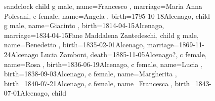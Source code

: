 \documentclass{article}
\begin{document}
\begin{figure}
\begin{minipage}[b]{0.19\textwidth}
\centering

    \begin{genealogypicture}[
        processing=database,
        database format=full,
        node size=3.5cm,
        level size=2.8cm,
        level distance=6mm,
        list separators hang=3mm,
        name font=\bfseries,
        surn code={\textcolor{black!50!black}{#1}},
        place text={\newline}{},
        date format=d month yyyy,
        tcbset={male/.style={colframe=blue,colback=blue!5},
        female/.style={colframe=red,colback=red!5}},
        box={fit basedim=7pt,boxsep=2pt,segmentation style=solid,
            halign=left,before upper=\parskip1pt,
            \gtrDBsex,
        },
    ]
    sandclock
    {
        child{
            g{
                male,
                name={Francesco },
                marriage={Maria Anna Polesani}{},
            }
            c{
                female,
                name={Angela },
                birth={1795-10-18}{Alcenago},
            }
            child{
                g{
                    male,
                    name={Giacinto },
                    birth={1814-04-15}{Alcenago},
                    marriage={1834-04-15}{Fane \newline Maddalena Zantedeschi},
                }
                child{
                    g{
                        male,
                        name={Benedetto },
                        birth={1835-02-01}{Alcenago},
                        marriage={1869-11-24}{Alcenago \newline Lucia Zamboni},
                        death={1885-11-05}{Alcenago?},
                    }
                }
                c{
                    female,
                    name={Rosa },
                    birth={1836-06-19}{Alcenago},
                }
                c{
                    female,
                    name={Lucia },
                    birth={1838-09-03}{Alcenago},
                }
                c{
                    female,
                    name={Margherita },
                    birth={1840-07-21}{Alcenago},
                }
                c{
                    female,
                    name={Francesca },
                    birth={1843-07-01}{Alcenago},
                }
                child{
}}}}
\end{genealogypicture}
\end{minipage}
\end{figure}
\end{document}
